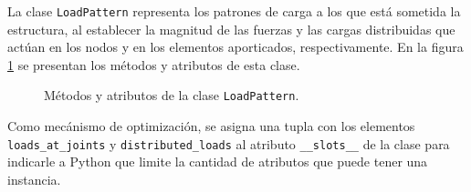 La clase \verb|LoadPattern| representa los patrones de carga a los que está sometida la estructura, al establecer la magnitud de las fuerzas y las cargas distribuidas que actúan en los nodos y en los elementos aporticados, respectivamente. En la figura \ref{fig:pyFEM-LoadPattern} se presentan los métodos y atributos de esta clase.\\

\begin{figure}[ht]
  \centering
  \caption{Métodos y atributos de la clase \texttt{LoadPattern}.}
  \label{fig:pyFEM-LoadPattern}
\end{figure}

Como mecánismo de optimización, se asigna una tupla con los elementos \verb|loads_at_joints| y \verb|distributed_loads| al atributo \verb|__slots__| de la clase para indicarle a Python que limite la cantidad de atributos que puede tener una instancia.\\

